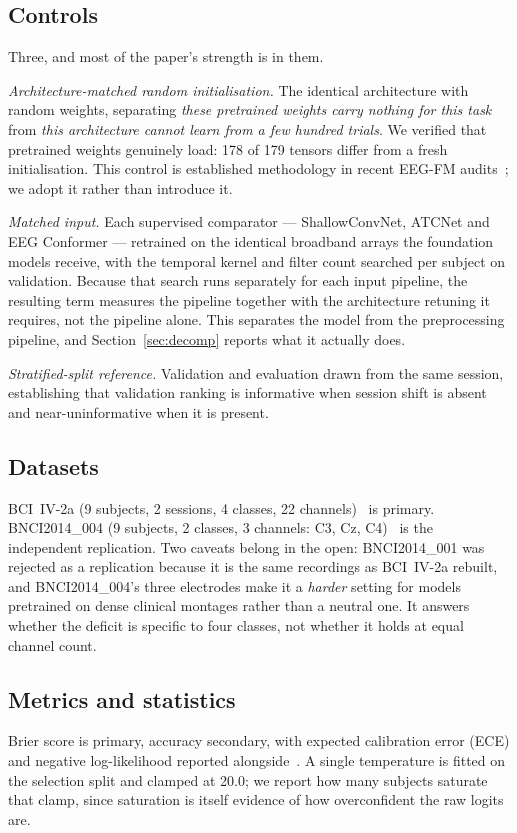 \subsection{Controls}
Three, and most of the paper's strength is in them.

\emph{Architecture-matched random initialisation.} The identical architecture
with random weights, separating \emph{these pretrained weights carry nothing
for this task} from \emph{this architecture cannot learn from a few hundred
trials}. We verified that pretrained weights genuinely load: 178 of 179 tensors
differ from a fresh initialisation. This control is established methodology in
recent EEG-FM
audits~\cite{kontras2026neuroatlas,banville2026neuralbench,zare2026negativecontrol};
we adopt it rather than introduce it.

\emph{Matched input.} Each supervised comparator --- ShallowConvNet, ATCNet and
EEG Conformer --- retrained on the identical broadband arrays the foundation
models receive, with the temporal kernel and filter count searched per subject
on validation. Because that search runs separately for each input pipeline, the
resulting term measures the pipeline together with the architecture retuning it
requires, not the pipeline alone. This separates the model from
the preprocessing pipeline, and Section~\ref{sec:decomp} reports what it
actually does.

\emph{Stratified-split reference.} Validation and evaluation drawn from the
same session, establishing that validation ranking is informative when session
shift is absent and near-uninformative when it is present.

\subsection{Datasets}
BCI~IV-2a (9 subjects, 2 sessions, 4 classes, 22
channels)~\cite{brunner2008graz,tangermann2012competition} is primary.
BNCI2014\_004 (9 subjects, 2 classes, 3 channels: C3, Cz,
C4)~\cite{leeb2007bnci004} is the independent replication. Two caveats belong
in the open: BNCI2014\_001 was rejected as a replication because it is the same
recordings as BCI~IV-2a rebuilt, and BNCI2014\_004's three electrodes make it a
\emph{harder} setting for models pretrained on dense clinical montages rather
than a neutral one. It answers whether the deficit is specific to four classes,
not whether it holds at equal channel count.

\subsection{Metrics and statistics}
Brier score is primary, accuracy secondary, with expected calibration error
(ECE) and negative log-likelihood reported
alongside~\cite{brier1950verification,gneiting2007proper}. A single temperature
is fitted on the selection split and clamped at 20.0; we report how many
subjects saturate that clamp, since saturation is itself evidence of how
overconfident the raw logits are.

